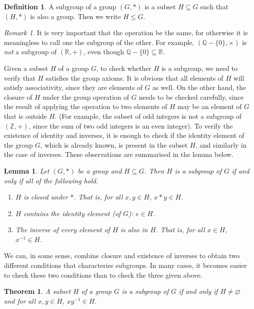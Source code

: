 \documentclass[svgnames]{article}
\newtheorem{Theorem}{Theorem}[section]
\newtheorem{Lemma}[Lemma]{Lemma}
\theoremstyle{definition}
\newtheorem{Definition}[Definition]{Definition}
\theoremstyle{remark}
\newtheorem*{Remark*}{Remark}
\newcommand{\newterm}[1]{{\color{alertcolor} #1}}
\begin{document}
\begin{Definition}\label{def:Subgroup}
A \newterm{subgroup} of a group $(G, *)$ is a subset $H \subseteq G$ such that $(H, *)$ is also a group. Then we write $H \le G$.
\end{Definition}

\begin{Remark*}
It is very important that the operation be the same, for otherwise it is meaningless to call one the subgroup of the other. For example, $(\mathbb Q - \{0\}, \times)$ is \textit{not} a subgroup of $(\mathbb R, +)$, even though $\mathbb Q - \{0\} \subseteq \mathbb R$.
\end{Remark*}

Given a subset $H$ of a group $G$, to check whether $H$ is a subgroup, we need to verify that $H$ satisfies the group axioms. It is obvious that all elements of $H$ will satisfy associativity, since they are elements of $G$ as well. On the other hand, the closure of $H$ under the group operation of $G$ needs to be checked carefully, since the result of applying the operation to two elements of $H$ may be an element of $G$ that is outside $H$. (For example, the subset of odd integers is not a subgroup of $(\mathbb Z, +)$, since the sum of two odd integers is an even integer). To verify the existence of identity and inverses, it is enough to check if the identity element of the group $G$, which is already known, is present in the subset $H$, and similarly in the case of inverses. These observations are summarised in the lemma below.

\begin{Lemma}\label{lem:Subgroups}
Let $(G, *)$ be a group and $H \subseteq G$. Then $H$ is a subgroup of $G$ if and only if all of the following hold.
\begin{enumerate}
\item $H$ is closed under $*$. That is, for all $x, y \in H$, $x*y \in H$.
\item $H$ contains the identity element (of $G$): $e \in H$.
\item The inverse of every element of $H$ is also in $H$. That is, for all $x \in H$, $x^{-1} \in H$.
\end{enumerate}
\end{Lemma}

We can, in some sense, combine closure and existence of inverses to obtain two different conditions that characterise subgroups. In many cases, it becomes easier to check these two conditions than to check the three given above.
\begin{Theorem}\label{thm:Subgroups}
A subset $H$ of a group $G$ is a subgroup of $G$ if and only if $H \ne \varnothing$ and for all $x, y \in H$, $xy^{-1} \in H$.
\end{Theorem}
\end{document}

